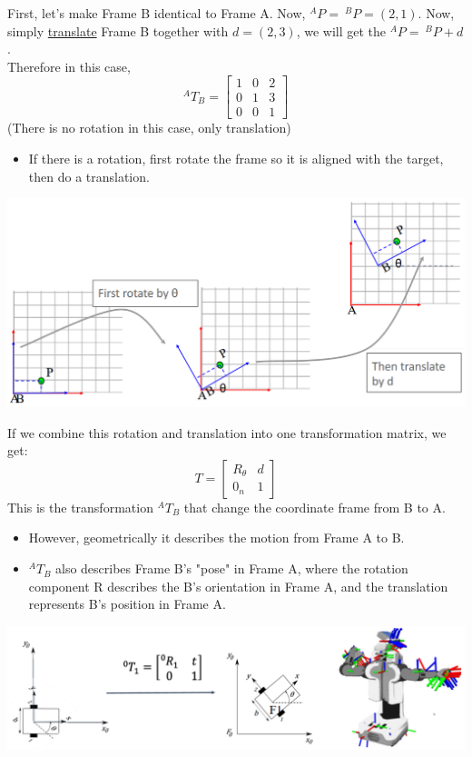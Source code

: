 \documentclass[10pt]{article}
\begin{document}
First, let's make Frame B identical to Frame A.  Now, $^A P = \:^B P = (2, 1)$.  Now, simply \underline{translate} Frame B together with $d = (2, 3)$, we will get the $^A P = \:^B P + d$.\\
Therefore in this case,
\[^A T_B = \begin{bmatrix} 1 & 0 & 2 \\ 0 & 1 & 3 \\ 0 & 0 & 1 \end{bmatrix}\]
(There is no rotation in this case, only translation)
\begin{itemize}
	\item If there is a rotation, first rotate the frame so it is aligned with the target, then do a translation.
\end{itemize}
\begin{center} 
	\includegraphics*[width=\textwidth]{L1_11.png} 
\end{center}
If we combine this rotation and translation into one transformation matrix, we get:
\[T = \begin{bmatrix} R_\theta & d \\ 0_n & 1 \end{bmatrix}\]
This is the transformation $^A T_B$ that change the coordinate frame from B to A.
\begin{itemize}
	\item However, geometrically it describes the motion from Frame A to B.
	\item $^A T_B$ also describes Frame B's "pose" in Frame A, where the rotation component R describes the B's orientation in Frame A, and the translation represents B's position in Frame A.
\end{itemize}
\begin{center} 
	\includegraphics*[width=\textwidth]{L1_12.png} 
\end{center}
\end{document}
